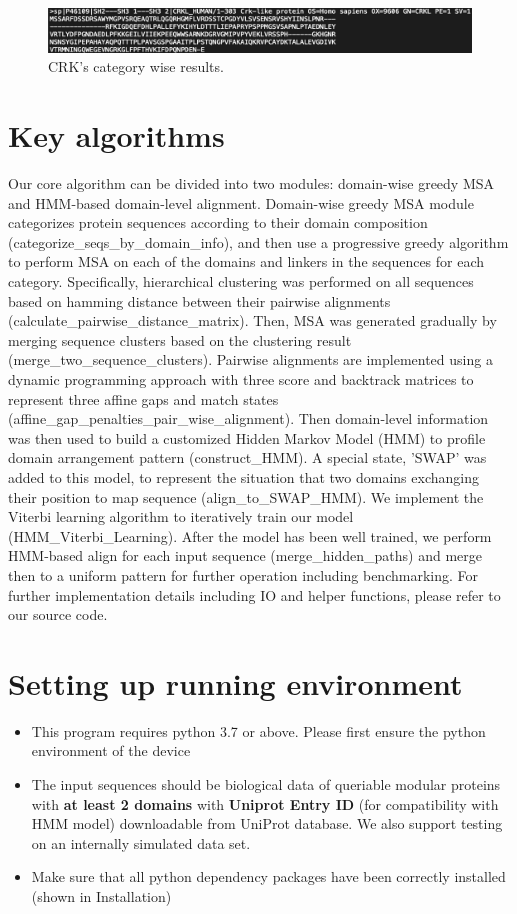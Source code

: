 \documentclass{article}
\begin{document}
\begin{figure}
\centering
\includegraphics[scale=0.45]{1.png}
\caption{\label{fig:1}CRK's category wise results.}
\end{figure}

\section{Key algorithms}
Our core algorithm can be divided into two modules: domain-wise greedy MSA and HMM-based domain-level alignment. Domain-wise greedy MSA module categorizes protein sequences according to their domain composition (categorize\_seqs\_by\_domain\_info), and then use a progressive greedy algorithm to perform MSA on each of the domains and linkers in the sequences for each category. Specifically, hierarchical clustering was performed on all sequences based on hamming distance between their pairwise alignments (calculate\_pairwise\_distance\_matrix). Then, MSA was generated gradually by merging sequence clusters based on the clustering result (merge\_two\_sequence\_clusters). Pairwise alignments are implemented using a dynamic programming approach with three score and backtrack matrices to represent three affine gaps and match states (affine\_gap\_penalties\_pair\_wise\_alignment). Then domain-level information was then used to build a customized Hidden Markov Model (HMM) to profile domain arrangement pattern (construct\_HMM). A special state, 'SWAP' was added to this model, to represent the situation that two domains exchanging their position to map sequence (align\_to\_SWAP\_HMM). We implement the Viterbi learning algorithm to iteratively train our model (HMM\_Viterbi\_Learning). After the model has been well trained, we perform HMM-based align for each input sequence (merge\_hidden\_paths) and merge then to a uniform pattern for further operation including benchmarking. For further implementation details including IO and helper functions, please refer to our source code.

\section{Setting up running environment}
\begin{itemize}
\item This program requires python 3.7 or above. Please first ensure the python environment of the device
\item The input sequences should be biological data of queriable modular proteins with \textbf{at least 2 domains} with \textbf{Uniprot Entry ID} (for compatibility with HMM model) downloadable from UniProt database. We also support testing on an internally simulated data set. 
\item Make sure that all python dependency packages have been correctly installed (shown in Installation)
\end{itemize}
\end{document}
